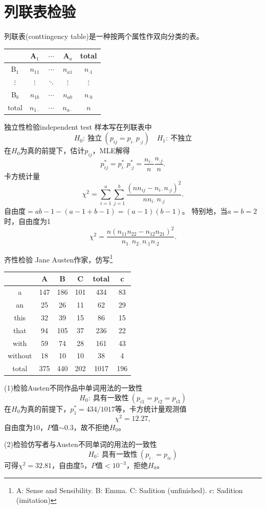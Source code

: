 \section{列联表检验}
列联表(conttingency table)是一种按两个属性作双向分类的表。
\begin{center}
	\begin{tabular}{c|ccc|c}
		\toprule
		&A$_1$&$\cdots$&A$_a$&total\\
		\hline
		B$_1$&$n_{11}$&$\cdots$&$n_{a1}$&$n_{\cdot 1}$\\
		$\vdots$&$\vdots$&$\ddots$&$\vdots$&$\vdots$\\
		B$_b$&$n_{1b}$&$\cdots$&$n_{ab}$&$n_{\cdot b}$\\
		\hline
		total&$n_{1\cdot}$&$\cdots$&$n_{a\cdot}$&$n$\\
		\bottomrule
	\end{tabular}
\end{center}
\begin{example}{独立性检验}{independent test}
	样本写在列联表中
	\[
		H_0:~\text{独立}~(p_{ij}=p_{i\cdot}p_{\cdot j})\quad H_1:~\text{不独立}
	\]
	在$H_0$为真的前提下，估计$p_{ij}$，MLE解得
	\[
		p_{ij}^\ast=p_{i\cdot}^\ast p_{\cdot j}^\ast=\frac{n_{i\cdot}}n\frac{n_{\cdot j}}n.
	\]
	卡方统计量
	\begin{equation}
		\chi^2=\sum_{i=1}^a\sum_{j=1}^b\frac{(nn_{ij}-n_{i\cdot}n_{\cdot j})^2}{nn_{i\cdot}n_{\cdot j}}.
	\end{equation}
	自由度$=ab-1-(a-1+b-1)=(a-1)(b-1)$。
	\tcblower
	特别地，当$a=b=2$时，自由度为1
	\[
		\chi^2=\frac{n(n_{11}n_{22}-n_{12}n_{21})^2}{n_{1\cdot}n_{2\cdot}n_{\cdot 1}n_{\cdot 2}}.
	\]
\end{example}
\begin{example}{齐性检验}{}
	Jane Austen作家，仿写\footnote{A: Sense and Sensibility. B: Emma. C: Sadition (unfinished). c: Sadition (imitation)}
	\begin{center}
		\begin{tabular}{c|ccc|c|c}
			\toprule
			&A&B&C&total&c\\
			\hline
			a&147&186&101&434&83\\
			an&25&26&11&62&29\\
			this&32&39&15&86&15\\
			that&94&105&37&236&22\\
			with&59&74&28&161&43\\
			without&18&10&10&38&4\\
			\hline
			total&375&440&202&1017&196\\
			\bottomrule
		\end{tabular}
	\end{center}
	(1)检验Austen不同作品中单词用法的一致性
	\[
		H_0:~\text{具有一致性}~(p_{i1}=p_{i2}=p_{i3})
	\]
	在$H_0$为真的前提下，$p_1^\ast=434/1017$等，卡方统计量观测值
	\[
		\chi^2=12.27,
	\]
	自由度为10，$P$值$\sim 0.3$，故不拒绝$H_0$。

	(2)检验仿写者与Austen不同单词的用法的一致性
	\[
		H_0:~\text{具有一致性}~(p_{i\cdot}=p_{i\mathrm c})
	\]
	可得$\chi^2=32.81$，自由度5，$P$值$<10^{-3}$，拒绝$H_0$。
\end{example}
